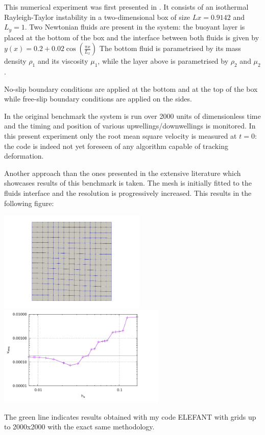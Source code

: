 This numerical experiment was first presented in \cite{vaks97}.
It consists of an isothermal Rayleigh-Taylor instability in a two-dimensional box
of size $Lx=0.9142$ and $L_y=1$.
Two Newtonian fluids are present in the system: the buoyant layer is placed at the bottom of 
the box and the interface between both fluids is given by 
$
y(x)=0.2+0.02\cos \left( \frac{\pi x}{L_x}  \right)
$
The bottom fluid is parametrised by its mass density $\rho_1$ and its viscosity $\mu_1$, 
while the layer above is parametrised by $\rho_2$ and $\mu_2$.

No-slip boundary conditions are applied at the bottom and at the top of the box 
while free-slip boundary conditions are applied on the sides. 

In the original benchmark the system is run over 2000 units of dimensionless time and the 
timing and position of various upwellings/downwellings is monitored. 
In this present experiment only the root mean square velocity is measured at $t=0$:
the code is indeed not yet foreseen of any algorithm capable of tracking deformation.

Another approach than the ones presented in the extensive literature which showcases 
results of this benchmark is taken. The mesh is initially fitted to the fluids
interface and the resolution is progressively increased. This results in the 
following figure:

\begin{center}
\includegraphics[width=7cm]{python_codes/fieldstone_25/images/grid}
\includegraphics[width=8cm]{python_codes/fieldstone_25/images/vrms.pdf}
\end{center}
The green line indicates results obtained with my code ELEFANT with grids up to 2000x2000
with the exact same methodology.

